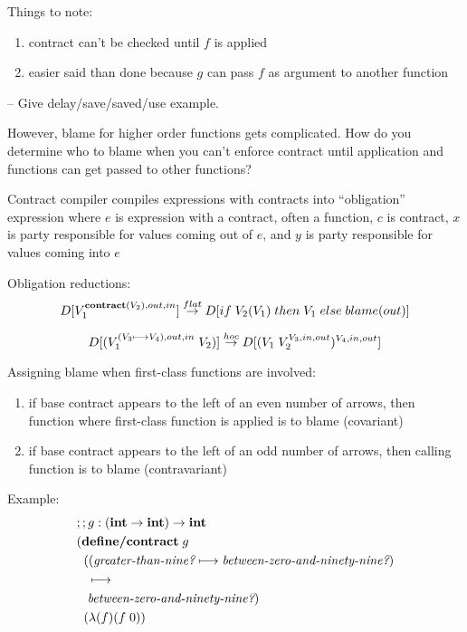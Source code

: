 \documentclass[12pt]{article}	%
\newcommand{\keyw}[1]{ \ensuremath{ \textbf{#1} } }
\newcommand{\integer}{ \keyw{int} }
\newcommand{\intint}{ \ensuremath{ \integer\rightarrow\integer } }
\newcommand{\defcontract}{ \keyw{define/contract} }
\newcommand{\contract}{ \ensuremath{ \longmapsto } }
\newcommand{\flatred}{ \ensuremath{ \stackrel{flat}{\rightarrow} } }
\newcommand{\hocred}{ \ensuremath{ \stackrel{hoc}{\rightarrow} } }
\newcommand{\flatcons}[1]{ \ensuremath{ \textbf{contract}(#1) } }
\begin{document}
Things to note:
\begin{enumerate}
	\item contract can't be checked until $f$ is applied
	\item easier said than done because $g$ can pass $f$ as argument to another function
\end{enumerate}

-- Give delay/save/saved/use example.

However, blame for higher order functions gets complicated. How do you determine who to blame when you can't enforce contract until application and functions can get passed to other functions?

Contract compiler compiles expressions with contracts into ``obligation'' expression  where $e$ is expression with a contract, often a function, $c$ is contract, $x$ is party responsible for values coming out of $e$, and $y$ is party responsible for values coming into $e$

Obligation reductions: \\

$$D[\oblig{V_1}{\flatcons{V_2}}{out}{in}] \flatred 
  D[if\;V_2(V_1)\;then\;V_1\;else\; blame(out)]$$

$$D[(\oblig{V_1}{(V_3\longmapsto V_4)}{out}{in}\;V_2)] \hocred 
  D[\oblig{(V_1 \;\oblig{V_2}{V_3}{in}{out})}{V_4}{in}{out}]$$

Assigning blame when first-class functions are involved:
\begin{enumerate}
	\item if base contract appears to the left of an even number of arrows, then function where first-class function is applied is to blame (covariant)
	\item if base contract appears to the left of an odd number of arrows, then calling function is to blame (contravariant)
\end{enumerate}

Example:
\begin{align*}
& ;; g:(\intint)\rightarrow\integer \\
& (\defcontract \; g \\
& \;\;((\greaterthannine \contract \betweenzeroandninetynine) \\
& \hspace{3mm} \contract \\
& \hspace{3mm} \betweenzeroandninetynine) \\
& \;\;(\lambda(f)(f \; 0)) 
\end{align*}
\end{document}
